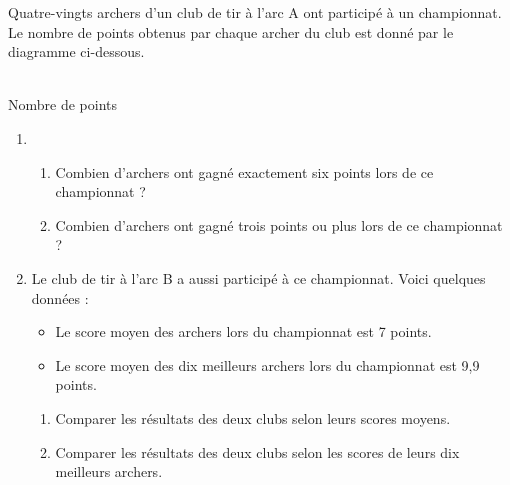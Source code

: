 \begin{exercice*}
   Quatre-vingts archers d'un club de tir à l'arc A ont participé à un championnat. Le nombre de points obtenus par chaque archer du club est donné par le diagramme ci-dessous.
   \begin{center}
      {\footnotesize      
       \\ [-2mm]
   \hspace*{50mm} Nombre de points}
   \end{center}
   \vspace*{-10mm}
   \begin{enumerate}
      \item 
      \begin{enumerate}
         \item Combien d'archers ont gagné exactement six points lors de ce championnat ?
         \item Combien d'archers ont gagné trois points ou plus lors de ce championnat ?
      \end{enumerate}
      \item Le club de tir à l'arc B a aussi participé à ce championnat. Voici quelques données :
      \begin{itemize}
         \item Le score moyen des archers lors du championnat est 7 points.
         \item Le score moyen des dix meilleurs archers lors du championnat est 9,9 points. \\ [-10mm]
      \end{itemize}
      \begin{enumerate}
         \item Comparer les résultats des deux clubs selon leurs scores moyens.
         \item Comparer les résultats des deux clubs selon les scores de leurs dix meilleurs archers.
      \end{enumerate}
   \end{enumerate}
\end{exercice*}


